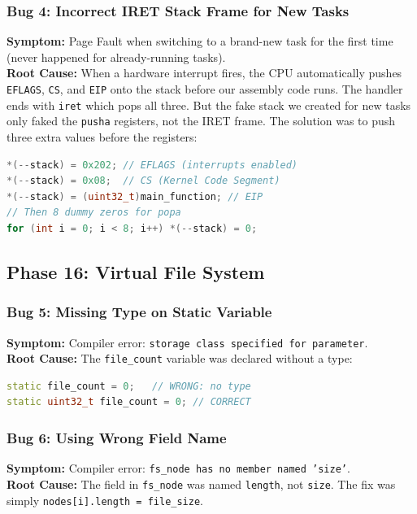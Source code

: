 \documentclass[12pt,a4paper]{report}
\begin{document}
\subsubsection*{Bug 4: Incorrect IRET Stack Frame for New Tasks}
\textbf{Symptom:} Page Fault when switching to a brand-new task for the first time (never happened for already-running tasks).\\
\textbf{Root Cause:} When a hardware interrupt fires, the CPU automatically pushes \texttt{EFLAGS}, \texttt{CS}, and \texttt{EIP} onto the stack before our assembly code runs. The handler ends with \texttt{iret} which pops all three. But the fake stack we created for new tasks only faked the \texttt{pusha} registers, not the IRET frame. The solution was to push three extra values before the registers:
\begin{lstlisting}[language=C++]
*(--stack) = 0x202; // EFLAGS (interrupts enabled)
*(--stack) = 0x08;  // CS (Kernel Code Segment)
*(--stack) = (uint32_t)main_function; // EIP
// Then 8 dummy zeros for popa
for (int i = 0; i < 8; i++) *(--stack) = 0;
\end{lstlisting}

\subsection*{Phase 16: Virtual File System}

\subsubsection*{Bug 5: Missing Type on Static Variable}
\textbf{Symptom:} Compiler error: \texttt{storage class specified for parameter}.\\
\textbf{Root Cause:} The \texttt{file\_count} variable was declared without a type:
\begin{lstlisting}[language=C++]
static file_count = 0;   // WRONG: no type
static uint32_t file_count = 0; // CORRECT
\end{lstlisting}

\subsubsection*{Bug 6: Using Wrong Field Name}
\textbf{Symptom:} Compiler error: \texttt{fs\_node has no member named 'size'}.\\
\textbf{Root Cause:} The field in \texttt{fs\_node} was named \texttt{length}, not \texttt{size}. The fix was simply \texttt{nodes[i].length = file\_size}.
\end{document}
